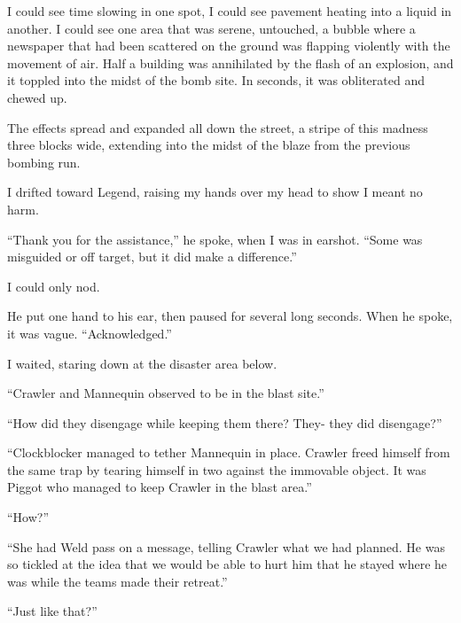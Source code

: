 I could see time slowing in one spot, I could see pavement heating into a liquid in another.  I could see one area that was serene, untouched, a bubble where a newspaper that had been scattered on the ground was flapping violently with the movement of air.  Half a building was annihilated by the flash of an explosion, and it toppled into the midst of the bomb site.  In seconds, it was obliterated and chewed up.



The effects spread and expanded all down the street, a stripe of this madness three blocks wide, extending into the midst of the blaze from the previous bombing run.



I drifted toward Legend, raising my hands over my head to show I meant no harm.



``Thank you for the assistance,'' he spoke, when I was in earshot.  ``Some was misguided or off target, but it did make a difference.''



I could only nod.



He put one hand to his ear, then paused for several long seconds.  When he spoke, it was vague.  ``Acknowledged.''



I waited, staring down at the disaster area below.



``Crawler and Mannequin observed to be in the blast site.''



``How did they disengage while keeping them there?  They- they did disengage?''



``Clockblocker managed to tether Mannequin in place.  Crawler freed himself from the same trap by tearing himself in two against the immovable object.  It was Piggot who managed to keep Crawler in the blast area.''



``How?''



``She had Weld pass on a message, telling Crawler what we had planned.  He was so tickled at the idea that we would be able to hurt him that he stayed where he was while the teams made their retreat.''



``Just like that?''



